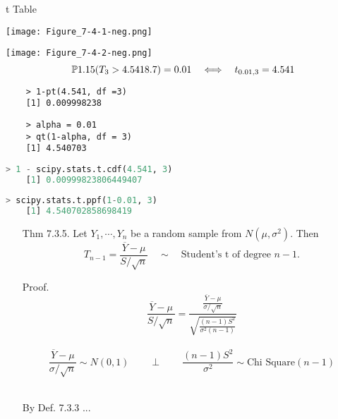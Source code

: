\begin{frame}[fragile]{t Table}
\begin{center}
	\texttt{[image: Figure\_7-4-1-neg.png]}

	\texttt{[image: Figure\_7-4-2-neg.png]}
	\[
		\mathbb{P}1.15(T_3>4.541 8.7) = 0.01 \quad \Longleftrightarrow \quad
		t_{0.01,3} = 4.541
	\]

	\begin{minipage}{0.4\textwidth}
	\begin{lstlisting}
	> 1-pt(4.541, df =3)
	[1] 0.009998238
	\end{lstlisting}
	\end{minipage}
	\qquad
	\begin{minipage}{0.4\textwidth}
	\begin{lstlisting}
	> alpha = 0.01
	> qt(1-alpha, df = 3)
	[1] 4.540703
	\end{lstlisting}
	\end{minipage}
  \vspace{-2em}

	\begin{minipage}{0.4\textwidth}
	\begin{lstlisting}[language=Python]
	> 1 - scipy.stats.t.cdf(4.541, 3)
	[1] 0.00999823806449407
	\end{lstlisting}
	\end{minipage}
	\qquad
	\begin{minipage}{0.4\textwidth}
	\begin{lstlisting}[language=Python]
	> scipy.stats.t.ppf(1-0.01, 3)
	[1] 4.540702858698419
	\end{lstlisting}
	\end{minipage}
\end{center}
\end{frame}
\begin{frame}
\begin{enumerate}
	\item[Thm \small 7.3.5.] Let $Y_1,\cdots, Y_n$ be a random sample from $N(\mu,\sigma^2)$. Then
		\[
		T_{n-1} = \frac{\overline{Y}-\mu}{S/\sqrt{n}} \quad \sim \quad \text{Student's t of degree $n-1$.}
		\]
	\vfill
	\item[Proof.]
		\[
			\frac{\overline{Y}-\mu}{S/\sqrt{n}}  =  \frac{\displaystyle
				\frac{\overline{Y}-\mu}{\sigma/\sqrt{n}}
			}{
			\displaystyle
			\sqrt{ \frac{(n-1)S^2}{\sigma^2 (n-1)}}
		}
		\]
		\pause\\[1em]
		\[
			\frac{\overline{Y}-\mu}{\sigma/\sqrt{n}}\sim N(0,1)\qquad \perp \qquad
		\frac{(n-1)S^2}{\sigma^2}
		\sim \text{Chi Square$(n-1)$}
		\]
	\\[2em]
	\item[] By Def. 7.3.3 ... \myEnd
\end{enumerate}
\end{frame}
